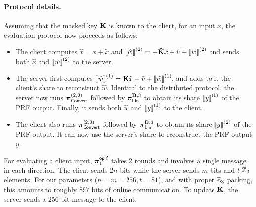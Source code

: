 \paragraph{Protocol details.} Assuming that the masked key $\hat{\mat{K}}$ is known to the client, for an input $x$,  the evaluation protocol now proceeds as follows:
\begin{itemize}
  \item The client computes $\hat{x} = x + \tilde{x}$ and $\share{\hat{w}}^{(2)} = -\mat{\hat{K}}\tilde{x} + \hat{v} + \share{\tilde{w}}^{(2)}$ and sends both $\hat{x}$ and $\left\llbracket \hat{w} \right\rrbracket^{(2)}$ to the server.

  \item The server first computes $\share{\hat{w}}^{(1)} = \mat{K}\hat{x} - \tilde{v} + \share{\tilde{w}}^{(1)}$, and adds to it the client's share to reconstruct $\hat{w}$. Identical to the distributed protocol, the server now runs $\boldsymbol{\pi}_{\textnormal{\textsf{Convert}}}^{(2,3)}$ followed by $\prot_\LMap^{\mat{B},3}$ to obtain its share $\left\llbracket y \right\rrbracket^{(1)}$ of the PRF output. Finally, it sends both $\hat{w}$ and $\left\llbracket y \right\rrbracket^{(1)}$ to the client.

  \item The client also runs $\boldsymbol{\pi}_{\textnormal{\textsf{Convert}}}^{(2,3)}$ followed by $\prot_\LMap^{\mat{B},3}$ to obtain its share $\left\llbracket y \right\rrbracket^{(2)}$ of the PRF output. It can now use the server's share to reconstruct the PRF output $y$.


\end{itemize}
For evaluating a client input, $\boldsymbol{\pi}^{\textsf{oprf}}_1$ takes 2 rounds and involves a single message in each direction. The client sends $2n$ bits while the server sends $m$ bits and $t$ $\mathbb{Z}_3$ elements. For our parameters ($n=m=256, t=81$), and with proper $\mathbb{Z}_3$ packing, this amounts to roughly $897$ bits of online communication. To update $\tilde{\mat{K}}$, the server sends a 256-bit message to the client.


